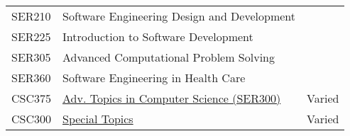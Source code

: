 \documentclass{article}
\begin{document}
\begin{longtable}{lll}
  SER210  &  Software Engineering Design and Development & \pageref{SER210}\\  
  SER225  &  Introduction to Software Development & \pageref{SER225}\\
  SER305  &  Advanced Computational Problem Solving & \pageref{SER305}\\
  SER360  & Software Engineering in Health Care   & \pageref{SER360}\\
  CSC375  &  \underline{Adv. Topics in Computer Science (SER300)}     & Varied \\ %
  CSC300  &  \underline{Special Topics}          & Varied \\                       %
\end{longtable}

\newpage

\newpage

\newpage

\newpage

\newpage

\newpage

\newpage

\newpage


\newpage

\newpage

\newpage

\newpage

\newpage

\newpage


% 
% 
% 
% 
% 
% 
% 
% 
% 
% 
% 
% 
% 
% 

\newpage

\newpage

\newpage

%
%
%
\newpage

\newpage

\newpage

%
\newpage

%
%
\newpage

\newpage

\newpage

\newpage

\newpage


%
%
%
%
%
%
\end{document}
